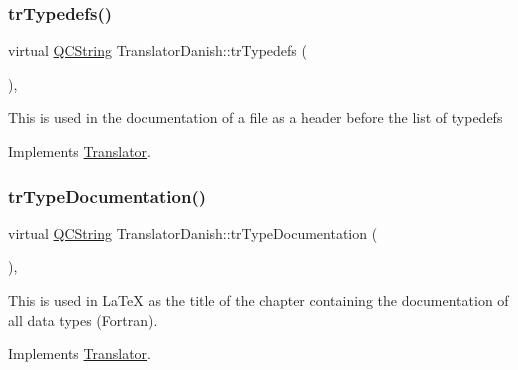 \mbox{\label{class_translator_danish_a413ba351d0a7fd4ebd78c1ae764e33e3}} 
\subsubsection{\texorpdfstring{trTypedefs()}{trTypedefs()}}
{\footnotesize\ttfamily virtual \mbox{\hyperlink{class_q_c_string}{Q\+C\+String}} Translator\+Danish\+::tr\+Typedefs (\begin{DoxyParamCaption}{ }\end{DoxyParamCaption})\hspace{0.3cm}{\ttfamily [inline]}, {\ttfamily [virtual]}}

This is used in the documentation of a file as a header before the list of typedefs 

Implements \mbox{\hyperlink{class_translator}{Translator}}.

\mbox{\label{class_translator_danish_aa34f4dd28e9913527eb3c9f19faadd7e}} 
\subsubsection{\texorpdfstring{trTypeDocumentation()}{trTypeDocumentation()}}
{\footnotesize\ttfamily virtual \mbox{\hyperlink{class_q_c_string}{Q\+C\+String}} Translator\+Danish\+::tr\+Type\+Documentation (\begin{DoxyParamCaption}{ }\end{DoxyParamCaption})\hspace{0.3cm}{\ttfamily [inline]}, {\ttfamily [virtual]}}

This is used in La\+TeX as the title of the chapter containing the documentation of all data types (Fortran). 

Implements \mbox{\hyperlink{class_translator}{Translator}}.

\mbox{\label{class_translator_danish_a1dc26788215b395df5e6a7cc140cab65}} 

